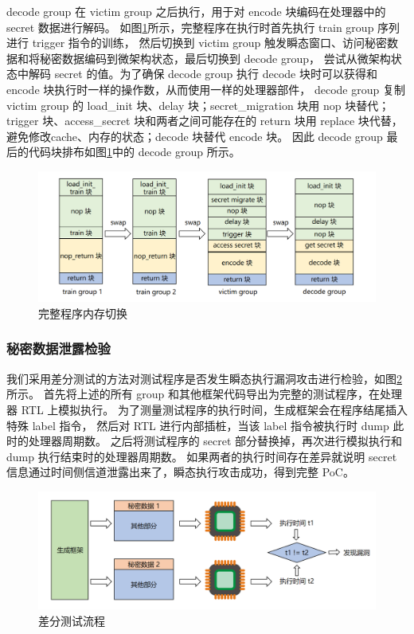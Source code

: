 decode group 在 victim group 之后执行，用于对 encode 块编码在处理器中的 secret 数据进行解码。
如图\ref{paper:group-switch-all}所示，完整程序在执行时首先执行 train group 序列进行 trigger 指令的训练，
然后切换到 victim group 触发瞬态窗口、访问秘密数据和将秘密数据编码到微架构状态，最后切换到 decode group，
尝试从微架构状态中解码 secret 的值。为了确保 decode group 执行 decode 块时可以获得和 encode 块执行时一样的操作数，从而使用一样的处理器部件，
decode group 复制 victim group 的 load\_init 块、delay 块；secret\_migration 块用 nop 块替代；
trigger 块、access\_secret 块和两者之间可能存在的 return 块用 replace 块代替，避免修改cache、内存的状态；decode 块替代 encode 块。
因此 decode group 最后的代码块排布如图\ref{paper:group-switch-all}中的 decode group 所示。\par

\begin{figure}[!h]
    \centering
    \includegraphics[width=\linewidth]{figure/paper/group-switch-all.png}
    \caption{完整程序内存切换}
    \label{paper:group-switch-all}
\end{figure}

\subsubsection{秘密数据泄露检验}

我们采用差分测试的方法对测试程序是否发生瞬态执行漏洞攻击进行检验，如图\ref{paper:differential-test}所示。
首先将上述的所有 group 和其他框架代码导出为完整的测试程序，在处理器 RTL 上模拟执行。
为了测量测试程序的执行时间，生成框架会在程序结尾插入特殊 label 指令，
然后对 RTL 进行内部插桩，当该 label 指令被执行时 dump 此时的处理器周期数。
之后将测试程序的 secret 部分替换掉，再次进行模拟执行和 dump 执行结束时的处理器周期数。
如果两者的执行时间存在差异就说明 secret 信息通过时间侧信道泄露出来了，瞬态执行攻击成功，得到完整 PoC。

\begin{figure}[!h]
    \centering
    \includegraphics[width=\linewidth]{figure/paper/differential-test.png}
    \caption{差分测试流程}
    \label{paper:differential-test}
\end{figure}

